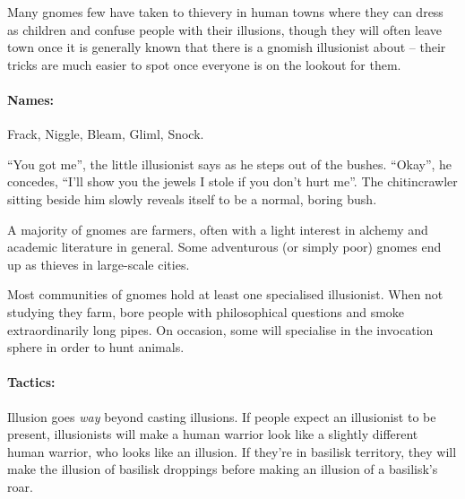 \begin{multicols}{2}
Many gnomes few have taken to thievery in human towns where they can dress as children and confuse people with their illusions, though they will often leave town once it is generally known that there is a gnomish illusionist about -- their tricks are much easier to spot once everyone is on the lookout for them.

\paragraph{Names:} Frack, Niggle, Bleam, Gliml, Snock.

\begin{boxtext}

	``You got me'', the little illusionist says as he steps out of the bushes.
	``Okay'', he concedes, ``I'll show you the jewels I stole if you don't hurt me''.
	The chitincrawler sitting beside him slowly reveals itself to be a normal, boring bush.

\end{boxtext}

\label{gnomish_citizen}

A majority of gnomes are farmers, often with a light interest in alchemy and academic literature in general.  Some adventurous (or simply poor) gnomes end up as thieves in large-scale cities.


\label{gnomish_illusionist}

Most communities of gnomes hold at least one specialised illusionist.  When not studying they farm, bore people with philosophical questions and smoke extraordinarily long pipes.  On occasion, some will specialise in the invocation sphere in order to hunt animals.


\paragraph{Tactics:} Illusion goes \emph{way} beyond casting illusions.
If people expect an illusionist to be present, illusionists will make a human warrior look like a slightly different human warrior, who looks like an illusion.
If they're in basilisk territory, they will make the illusion of basilisk droppings before making an illusion of a basilisk's roar.

\begin{boxtext}


\end{boxtext}
\end{multicols}
